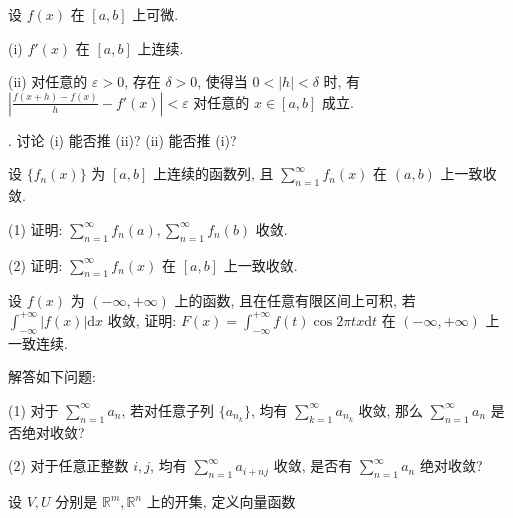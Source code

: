 设 $f(x)$ 在 $[a, b]$ 上可微.\par
(i)  $f'(x)$  在  $[a, b]$  上连续.\par
(ii) 对任意的 $\varepsilon > 0$, 存在 $\delta > 0$, 使得当 $0 < |h| < \delta$ 时, 有 $\left|\frac{f(x + h) - f(x)}{h} - f'(x)\right| < \varepsilon$ 对任意的 $x \in [a, b]$ 成立.\par
. 讨论 (i) 能否推 (ii)? (ii) 能否推 (i)?\par
设 $\{f_n(x)\}$ 为 $[a, b]$ 上连续的函数列, 且 $\sum_{n=1}^{\infty} f_n(x)$ 在 $(a, b)$ 上一致收敛.\par
(1) 证明: $\sum_{n=1}^{\infty} f_n(a), \sum_{n=1}^{\infty} f_n(b)$ 收敛.\par
(2) 证明: $\sum_{n=1}^{\infty} f_n(x)$ 在 $[a, b]$ 上一致收敛.\par
设 $f(x)$ 为 $(- \infty, + \infty)$ 上的函数, 且在任意有限区间上可积, 若 $\int_{-\infty}^{+\infty}|f(x)|\mathrm{d}x$ 收敛, 证明: $F(x) = \int_{-\infty}^{+\infty}f(t)\cos 2\pi tx\mathrm{d}t$ 在 $(- \infty, + \infty)$ 上一致连续.\par
解答如下问题:\par
(1) 对于 $\sum_{n=1}^{\infty} a_n$, 若对任意子列 $\{a_{n_k}\}$, 均有 $\sum_{k=1}^{\infty} a_{n_k}$ 收敛, 那么 $\sum_{n=1}^{\infty} a_n$ 是否绝对收敛?\par
(2) 对于任意正整数 $i, j$, 均有 $\sum_{n=1}^{\infty} a_{i+nj}$ 收敛, 是否有 $\sum_{n=1}^{\infty} a_n$ 绝对收敛?\par
\par{}
设 $V, U$ 分别是 $\mathbb{R}^m, \mathbb{R}^n$ 上的开集, 定义向量函数\par
\nopagebreak[4]

